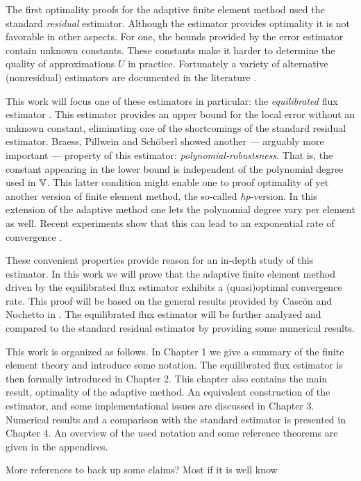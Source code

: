 \documentclass[thesis.tex]{subfiles}
\begin{document}
The first optimality proofs for the adaptive finite element method used the standard \emph{residual} estimator. Although
the estimator provides optimality it is not favorable in other aspects. For one, the bounds provided
by the error estimator contain unknown constants. These constants make it harder to determine the quality of 
approximations $U$ in practice.  Fortunately a variety of alternative (nonresidual) estimators are documented in the literature \cite{verfurth2013posteriori}.

This work will focus one of these estimators in particular:
the \emph{equilibrated} flux estimator \cite{braessequil, braessequilrobust, ernequil}. This estimator provides an upper bound
for the local error without an unknown constant, eliminating one of the shortcomings of the standard residual estimator. 
Braess, Pillwein and Sch\"oberl \cite{braessequilrobust} showed another --- arguably more important --- property of this estimator: \emph{polynomial-robustsness}. That is,
the constant appearing in the lower bound is independent of the polynomial degree used in $\mathbb{V}$.
This latter condition might enable one to proof optimality of yet another version of finite element method, the so-called
\emph{hp}-version. In this extension of the adaptive method one lets the polynomial degree vary per element as well.
Recent experiments show that this can lead to an exponential rate of convergence \cite{dolejvsi2015hp}.

These convenient properties provide reason for an in-depth study of this estimator.
In this work we will prove that the adaptive finite element method driven by the equilibrated flux estimator 
exhibits a (quasi)optimal convergence rate. This proof will be based on the general results provided by Casc\'on and Nochetto 
in \cite{cascon2012}. The equilibrated flux estimator will be further analyzed and compared to the standard residual estimator
by providing some numerical results. 

This work is organized as follows.
In Chapter 1 we give a summary of the finite element theory and introduce some notation. The equilibrated flux estimator is then formally introduced 
in Chapter 2. This chapter also contains the main result, optimality of the adaptive method. An equivalent construction of the estimator,
and some implementational issues are discussed in Chapter 3. Numerical results and a comparison with the standard estimator is presented
in Chapter 4. An overview of the used notation and some reference theorems are given in the appendices. 

{\color{blue} More references to back up some claims? Most if it is well know}
\end{document}
